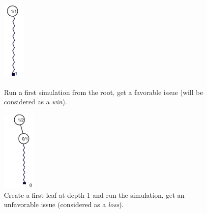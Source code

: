 \begin{figure}[H]
\centering
	\begin{minipage}[b]{0.45\linewidth}
		\centering
		\includegraphics[height=4cm]{1_Presentation/1.2_Algorithm_MCTS_Benoit/img/1.png}
		\caption{\label{fig:1}Run a first simulation from the root, get a favorable issue (will be considered as a \textit{win}).}
	\end{minipage}%
	\hspace*{1cm}
	\begin{minipage}[b]{0.45\linewidth}
		\centering
		\includegraphics[height=4cm]{1_Presentation/1.2_Algorithm_MCTS_Benoit/img/2.png}
		\caption{\label{fig:2}Create a first leaf at depth 1 and run the simulation, get an unfavorable issue (considered as a \textit{loss}).}
	\end{minipage}%
\end{figure}


